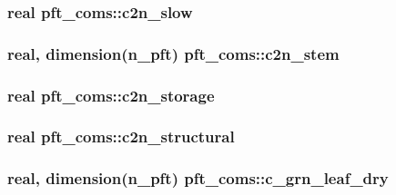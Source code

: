 \subsubsection[{c2n\+\_\+slow}]{\setlength{\rightskip}{0pt plus 5cm}real pft\+\_\+coms\+::c2n\+\_\+slow}\label{namespacepft__coms_a4cd2632f30c0c38883e4191eb65e352b}
\hypertarget{namespacepft__coms_a45821066c1cdf886389c40c7ddbefa7f}{}
\subsubsection[{c2n\+\_\+stem}]{\setlength{\rightskip}{0pt plus 5cm}real, dimension(n\+\_\+pft) pft\+\_\+coms\+::c2n\+\_\+stem}\label{namespacepft__coms_a45821066c1cdf886389c40c7ddbefa7f}
\hypertarget{namespacepft__coms_a2bdc4c753d41f0e863f3e00b13c8393f}{}
\subsubsection[{c2n\+\_\+storage}]{\setlength{\rightskip}{0pt plus 5cm}real pft\+\_\+coms\+::c2n\+\_\+storage}\label{namespacepft__coms_a2bdc4c753d41f0e863f3e00b13c8393f}
\hypertarget{namespacepft__coms_a8ff9ca7160d6ae9774adc3a314d8accd}{}
\subsubsection[{c2n\+\_\+structural}]{\setlength{\rightskip}{0pt plus 5cm}real pft\+\_\+coms\+::c2n\+\_\+structural}\label{namespacepft__coms_a8ff9ca7160d6ae9774adc3a314d8accd}
\hypertarget{namespacepft__coms_a07a700fcd19f741c23db148885753d33}{}
\subsubsection[{c\+\_\+grn\+\_\+leaf\+\_\+dry}]{\setlength{\rightskip}{0pt plus 5cm}real, dimension(n\+\_\+pft) pft\+\_\+coms\+::c\+\_\+grn\+\_\+leaf\+\_\+dry}\label{namespacepft__coms_a07a700fcd19f741c23db148885753d33}
\hypertarget{namespacepft__coms_a59778cca6e42ffcda34a2b44b31c0d80}{}
